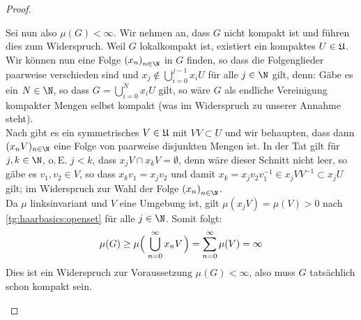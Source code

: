 \begin{proof}
\begin{enumerate}[(a)]
            Sei nun also $\mu(G)<\infty$. Wir nehmen an, dass $G$ nicht kompakt
            ist und führen dies zum Widerspruch. Weil $G$ lokalkompakt ist,
            existiert ein kompaktes $U\in\mathfrak{U}$. Wir können nun eine Folge
            $\Nfolge x$ in $G$ finden, so dass die Folgenglieder paarweise
            verschieden sind und
            $x_j\notin \bigcup_{i=0}^{j-1} x_iU$ für alle $j\in\N$ gilt, denn:
            Gäbe es ein $N\in\N$, so dass $G=\bigcup_{i=0}^N x_iU$ gilt, so wäre
            $G$ als endliche Vereinigung kompakter Mengen selbst kompakt (was im
            Widerspruch zu unserer Annahme steht).
            \\
            Nach 
            gibt es ein symmetrisches $V\in\mathfrak{U}$ mit $VV\subset U$ und wir
            behaupten, dass dann $(x_nV)_{n\in\N}$ eine Folge von paarweise
            disjunkten Mengen ist. In der Tat gilt für $j,k\in\N$, o.\,E. $j<k$,
            dass $x_jV \cap x_kV = \emptyset$, denn wäre dieser Schnitt nicht
            leer, so gäbe es $v_1,v_2\in V$, so dass $x_kv_1 = x_jv_2$ und damit
            $x_k=x_jv_2v_1^{-1} \in x_jVV^{-1} \subset x_jU$ gilt; im
            Widerspruch zur Wahl der Folge $\Nfolge x$.
            \\
            Da $\mu$ linksinvariant und $V$ eine Umgebung ist, 
            gilt $\mu(x_jV) = \mu(V) > 0$ nach \ref{tg:haarbasics:openset} für
            alle $j\in\N$.
            Somit folgt: 
            \[ \mu(G) \geq \mu\Bigl(\; \bigcup_{n=0}^\infty x_nV \mkern2mu\Bigr) 
                = \sum_{n=0}^\infty \mu(V) = \infty
            \]
            Dies ist ein Widerspruch zur Voraussetzung $\mu(G)<\infty$, also muss $G$
            tatsächlich schon kompakt sein.
    \end{enumerate}
\end{proof}


